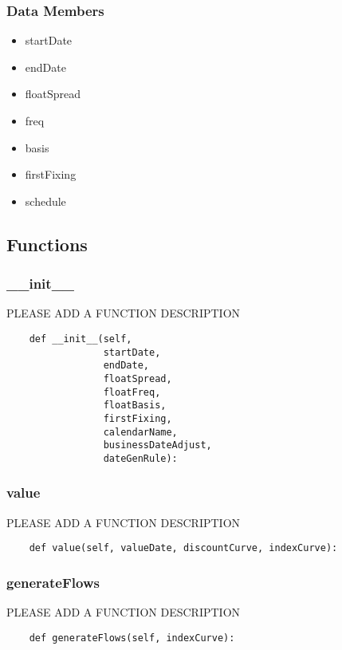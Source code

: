 \documentclass[twoside,11pt]{book}
\begin{document}
\subsubsection*{Data Members}
\begin{itemize}
\item{startDate}
\item{endDate}
\item{floatSpread}
\item{freq}
\item{basis}
\item{firstFixing}
\item{schedule}
\end{itemize}

\subsection*{Functions}

\subsubsection*{{\bf \_\_init\_\_}}
PLEASE ADD A FUNCTION DESCRIPTION

\begin{lstlisting}
    def __init__(self,
                 startDate,
                 endDate,
                 floatSpread,
                 floatFreq,
                 floatBasis,
                 firstFixing,
                 calendarName,
                 businessDateAdjust,
                 dateGenRule):
\end{lstlisting}

\subsubsection*{{\bf value}}
PLEASE ADD A FUNCTION DESCRIPTION

\begin{lstlisting}
    def value(self, valueDate, discountCurve, indexCurve):
\end{lstlisting}

\subsubsection*{{\bf generateFlows}}
PLEASE ADD A FUNCTION DESCRIPTION

\begin{lstlisting}
    def generateFlows(self, indexCurve):
\end{lstlisting}
\end{document}
